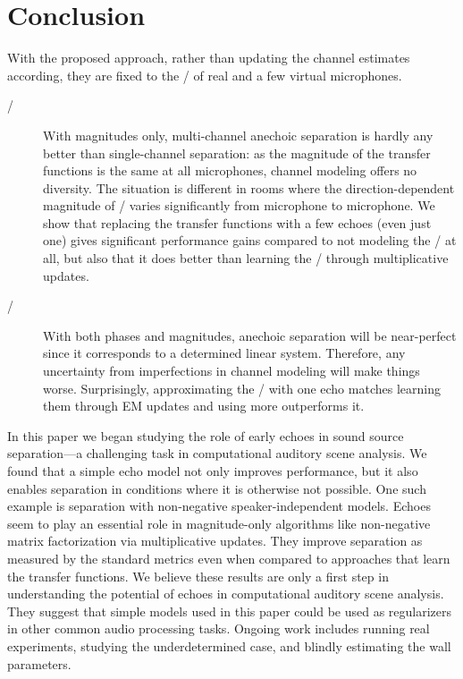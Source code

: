 \section{Conclusion}
With the proposed approach, rather than updating the channel estimates according, they are fixed to the \RTFs/ of real and a few virtual microphones.
\begin{description}
    \item[\MU/] With magnitudes only, multi-channel anechoic separation is hardly any better than single-channel separation:
    as the magnitude of the transfer functions is the same at all microphones, channel modeling offers no diversity.
    The situation is different in rooms where the direction-dependent magnitude of \RTFs/ varies significantly from microphone to microphone.
    We show that replacing the transfer functions with a few echoes (even just one) gives significant performance gains compared to not modeling the \RTFs/ at all,
    but also that it does better than learning the \RTFs/ through multiplicative updates.
    \item[\EM/] With both phases and magnitudes, anechoic separation will be near-perfect since it corresponds to a determined linear system.
    Therefore, any uncertainty from imperfections in channel modeling will make things worse.
    Surprisingly, approximating the \RTFs/ with one echo matches learning them through EM updates and using more outperforms it.
\end{description}


In this paper we began studying the role of early echoes in sound source separation---a challenging task in computational auditory scene analysis.
We found that a simple echo model not only improves performance, but it also enables separation in conditions where it is otherwise not possible.
One such example is separation with non-negative speaker-independent models.
Echoes seem to play an essential role in magnitude-only algorithms like non-negative matrix factorization via multiplicative updates.
They improve separation as measured by the standard metrics even when compared to approaches that learn the transfer functions.
We believe these results are only a first step in understanding the potential of echoes in computational auditory scene analysis.
They suggest that simple models used in this paper could be used as regularizers in other common audio processing tasks.
Ongoing work includes running real experiments, studying the underdetermined case, and blindly estimating the wall parameters.

